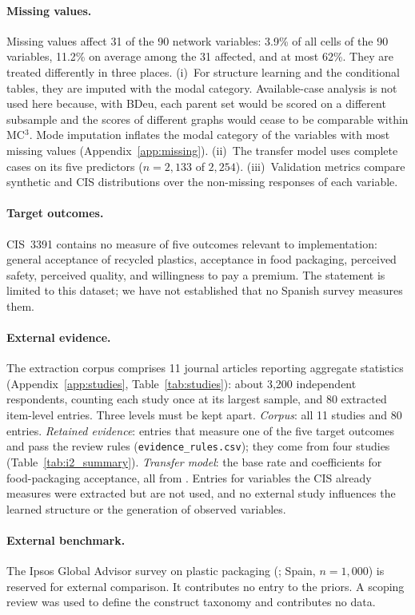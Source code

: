 \paragraph{Missing values.}
Missing values affect 31 of the 90 network variables: 3.9\% of all cells of the
90 variables, 11.2\% on average among the 31 affected, and at most 62\%. They
are treated differently in three places. (i)~For structure learning and the
conditional tables, they are imputed with the modal category. Available-case
analysis is not used here because, with BDeu, each parent set would be scored
on a different subsample and the scores of different graphs would cease to be
comparable within MC$^3$. Mode imputation inflates the modal category of the
variables with most missing values (Appendix~\ref{app:missing}). (ii)~The
transfer model uses complete cases on its five predictors ($n = 2{,}133$ of
$2{,}254$). (iii)~Validation metrics compare synthetic and CIS distributions
over the non-missing responses of each variable.

\paragraph{Target outcomes.}
CIS~3391 contains no measure of five outcomes relevant to implementation:
general acceptance of recycled plastics, acceptance in food packaging,
perceived safety, perceived quality, and willingness to pay a premium. The
statement is limited to this dataset; we have not established that no Spanish
survey measures them.

\paragraph{External evidence.}
The extraction corpus comprises 11 journal articles reporting aggregate
statistics (Appendix~\ref{app:studies}, Table~\ref{tab:studies}): about
3{,}200 independent respondents, counting each study once at its largest
sample, and 80 extracted item-level entries. Three levels must be kept apart.
\emph{Corpus}: all 11 studies and 80 entries. \emph{Retained evidence}: entries
that measure one of the five target outcomes and pass the review rules
(\texttt{evidence\_rules.csv}); they come from four studies
(Table~\ref{tab:i2_summary}). \emph{Transfer model}: the base rate and
coefficients for food-packaging acceptance, all from \citet{ruokamo2022}.
Entries for variables the CIS already measures were extracted but are not
used, and no external study influences the learned structure or the
generation of observed variables.

\paragraph{External benchmark.}
The Ipsos Global Advisor survey on plastic packaging (\citealp{ipsos2022};
Spain, $n = 1{,}000$) is reserved for external comparison. It contributes no
entry to the priors. A scoping review \citep{polyportis2022} was used to define
the construct taxonomy and contributes no data.

